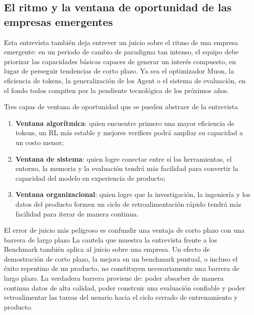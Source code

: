 \documentclass[a4paper]{article}
\begin{document}
\subsection{El ritmo y la ventana de oportunidad de las empresas emergentes}
Esta entrevista también deja entrever un juicio sobre el ritmo de una empresa emergente: en un periodo de cambio de paradigma tan intenso, el equipo debe priorizar las capacidades básicas capaces de generar un interés compuesto, en lugar de perseguir tendencias de corto plazo. Ya sea el optimizador Muon, la eficiencia de tokens, la generalización de los Agent o el sistema de evaluación, en el fondo todos compiten por la pendiente tecnológica de los próximos años.

\begin{knowledgebox}{Tres capas de ventana de oportunidad que se pueden abstraer de la entrevista}
\begin{enumerate}
    \item \textbf{Ventana algorítmica}: quien encuentre primero una mayor eficiencia de tokens, un RL más estable y mejores verifiers podrá ampliar su capacidad a un costo menor;
    \item \textbf{Ventana de sistema}: quien logre conectar entre sí las herramientas, el entorno, la memoria y la evaluación tendrá más facilidad para convertir la capacidad del modelo en experiencia de producto;
    \item \textbf{Ventana organizacional}: quien logre que la investigación, la ingeniería y los datos del producto formen un ciclo de retroalimentación rápido tendrá más facilidad para iterar de manera continua.
\end{enumerate}
\end{knowledgebox}

\begin{warningbox}{El error de juicio más peligroso es confundir una ventaja de corto plazo con una barrera de largo plazo}
La cautela que muestra la entrevista frente a los Benchmark también aplica al juicio sobre una empresa. Un efecto de demostración de corto plazo, la mejora en un benchmark puntual, o incluso el éxito repentino de un producto, no constituyen necesariamente una barrera de largo plazo. La verdadera barrera proviene de: poder absorber de manera continua datos de alta calidad, poder construir una evaluación confiable y poder retroalimentar las tareas del usuario hacia el ciclo cerrado de entrenamiento y producto.
\end{warningbox}
\end{document}
